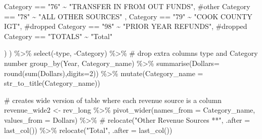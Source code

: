 \documentclass[
  letterpaper,
  DIV=11,
  numbers=noendperiod]{scrreport}
\newenvironment{Shaded}{\begin{snugshade}}{\end{snugshade}}
\newcommand{\AttributeTok}[1]{\textcolor[rgb]{0.40,0.45,0.13}{#1}}
\newcommand{\CommentTok}[1]{\textcolor[rgb]{0.37,0.37,0.37}{#1}}
\newcommand{\DecValTok}[1]{\textcolor[rgb]{0.68,0.00,0.00}{#1}}
\newcommand{\FunctionTok}[1]{\textcolor[rgb]{0.28,0.35,0.67}{#1}}
\newcommand{\NormalTok}[1]{\textcolor[rgb]{0.00,0.23,0.31}{#1}}
\newcommand{\OtherTok}[1]{\textcolor[rgb]{0.00,0.23,0.31}{#1}}
\newcommand{\SpecialCharTok}[1]{\textcolor[rgb]{0.37,0.37,0.37}{#1}}
\newcommand{\StringTok}[1]{\textcolor[rgb]{0.13,0.47,0.30}{#1}}
\begin{document}
\begin{Shaded}
\begin{Highlighting}[]
\NormalTok{    Category }\SpecialCharTok{==} \StringTok{"76"} \SpecialCharTok{\textasciitilde{}}  \StringTok{"TRANSFER IN FROM OUT FUNDS"}\NormalTok{,  }\CommentTok{\#other}
\NormalTok{    Category }\SpecialCharTok{==} \StringTok{"78"} \SpecialCharTok{\textasciitilde{}}  \StringTok{"ALL OTHER SOURCES"}\NormalTok{ ,}
\NormalTok{    Category }\SpecialCharTok{==} \StringTok{"79"} \SpecialCharTok{\textasciitilde{}}   \StringTok{"COOK COUNTY IGT"}\NormalTok{, }\CommentTok{\#dropped}
\NormalTok{    Category }\SpecialCharTok{==} \StringTok{"98"} \SpecialCharTok{\textasciitilde{}}  \StringTok{"PRIOR YEAR REFUNDS"}\NormalTok{, }\CommentTok{\#dropped}
\NormalTok{Category }\SpecialCharTok{==} \StringTok{"TOTALS"} \SpecialCharTok{\textasciitilde{}} \StringTok{"Total"}

\NormalTok{  ) ) }\SpecialCharTok{\%\textgreater{}\%} 
  \FunctionTok{select}\NormalTok{(}\SpecialCharTok{{-}}\NormalTok{type, }\SpecialCharTok{{-}}\NormalTok{Category) }\SpecialCharTok{\%\textgreater{}\%}  \CommentTok{\# drop extra columns type and Category number}
  \FunctionTok{group\_by}\NormalTok{(Year, Category\_name) }\SpecialCharTok{\%\textgreater{}\%}
  \FunctionTok{summarise}\NormalTok{(}\AttributeTok{Dollars=} \FunctionTok{round}\NormalTok{(}\FunctionTok{sum}\NormalTok{(Dollars),}\AttributeTok{digits=}\DecValTok{2}\NormalTok{)) }\SpecialCharTok{\%\textgreater{}\%} 
  \FunctionTok{mutate}\NormalTok{(}\AttributeTok{Category\_name =} \FunctionTok{str\_to\_title}\NormalTok{(Category\_name))}

\CommentTok{\# creates wide version of table where each revenue source is a column}
\NormalTok{revenue\_wide2 }\OtherTok{\textless{}{-}}\NormalTok{ rev\_long }\SpecialCharTok{\%\textgreater{}\%} \FunctionTok{pivot\_wider}\NormalTok{(}\AttributeTok{names\_from =}\NormalTok{ Category\_name, }
              \AttributeTok{values\_from =}\NormalTok{ Dollars) }\SpecialCharTok{\%\textgreater{}\%}
\CommentTok{\#  relocate("Other Revenue Sources **", .after = last\_col()) \%\textgreater{}\%}
  \FunctionTok{relocate}\NormalTok{(}\StringTok{"Total"}\NormalTok{, }\AttributeTok{.after =}  \FunctionTok{last\_col}\NormalTok{())}
\end{Highlighting}
\end{Shaded}
\end{document}
